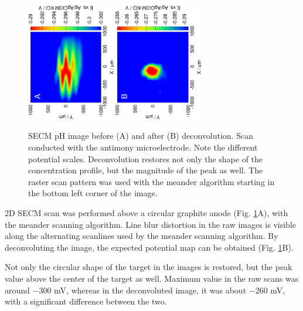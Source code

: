 \begin{figure}
\centering
\includegraphics[trim = 10mm 30mm 0mm 10mm, clip, width=0.35\textwidth, angle=-90]{img/pH_2D_Sb/13121313.eps}\includegraphics[trim = 10mm 30mm 0mm 10mm, clip, width=0.35\textwidth, angle=-90]{img/pH_2D_Sb/13121313_deconvoluted.eps}%
\caption{SECM pH image before (A) and after (B) deconvolution.
Scan conducted with the antimony microelectrode.
Note the different potential scales.
Deconvolution restores not only the shape of the concentration profile, but the magnitude of the peak as well.
The raster scan pattern was used with the meander algorithm starting in the bottom left corner of the image.}
\label{fig:deconvolution}
\end{figure}

2D SECM scan was performed above a circular graphite anode (Fig. \ref{fig:deconvolution}A), with the meander scanning algorithm.
Line blur distortion in the raw images is visible along the alternating scanlines used by the meander scanning algorithm.
By deconvoluting the image, the expected potential map can be obtained (Fig. \ref{fig:deconvolution}B). 

Not only the circular shape of the target in the images is restored, but the peak value above the center of the target as well.
Maximum value in the raw scans was around $-300$ mV, whereas in the deconvoluted image, it was about $-260$ mV, with a significant difference between the two. 

